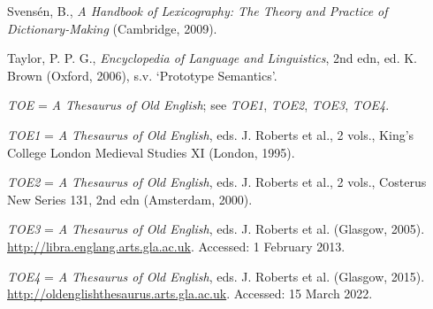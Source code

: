 \begin{list}{}


\item %
Svensén, B., \textit{A Handbook of Lexicography: The Theory and Practice of Dictionary-Making} (Cambridge, 2009).

\item %
Taylor, P. P. G., \textit{Encyclopedia of Language and Linguistics}, 2nd edn, ed. K. Brown (Oxford, 2006), s.v. `Prototype Semantics'.

\item %
\textit{TOE} = \textit{A Thesaurus of Old English}; see \textit{TOE1}, \textit{TOE2}, \textit{TOE3}, \textit{TOE4}.

\item %
\textit{TOE1} =	\textit{A Thesaurus of Old English}, eds. J. Roberts et al., 2 vols., King's College London Medieval Studies XI (London, 1995). 

\item %
\textit{TOE2} = \textit{A Thesaurus of Old English}, eds. J. Roberts et al., 2 vols., Costerus New Series 131, 2nd edn (Amsterdam, 2000).

\item %
\textit{TOE3} = \textit{A Thesaurus of Old English}, eds. J. Roberts et al. (Glasgow, 2005). \url{http://libra.englang.arts.gla.ac.uk}. Accessed: 1 February 2013.

\item %
\textit{TOE4} = \textit{A Thesaurus of Old English}, eds. J. Roberts et al. (Glasgow, 2015). \url{http://oldenglishthesaurus.arts.gla.ac.uk}. Accessed: 15 March 2022.




\end{list}
